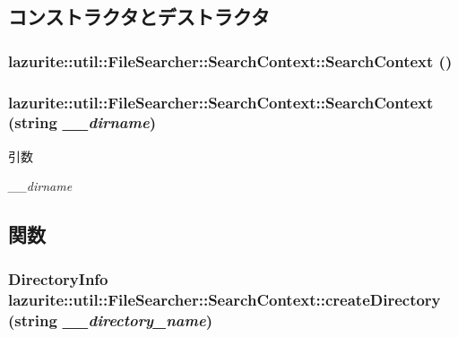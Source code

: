 \subsection{コンストラクタとデストラクタ}
\hypertarget{classlazurite_1_1util_1_1_file_searcher_1_1_search_context_a5a90c80e8b4e542a1ef42f04eb9fcbc2}{
\subsubsection[{SearchContext}]{\setlength{\rightskip}{0pt plus 5cm}lazurite::util::FileSearcher::SearchContext::SearchContext ()}}
\label{classlazurite_1_1util_1_1_file_searcher_1_1_search_context_a5a90c80e8b4e542a1ef42f04eb9fcbc2}
\hypertarget{classlazurite_1_1util_1_1_file_searcher_1_1_search_context_a41285ae06cde6bea5e886ad2a54d4b24}{
\subsubsection[{SearchContext}]{\setlength{\rightskip}{0pt plus 5cm}lazurite::util::FileSearcher::SearchContext::SearchContext (string {\em \_\-\_\-dirname})}}
\label{classlazurite_1_1util_1_1_file_searcher_1_1_search_context_a41285ae06cde6bea5e886ad2a54d4b24}

\begin{DoxyParams}{引数}
\item[{\em \_\-\_\-dirname}]\end{DoxyParams}


\subsection{関数}
\hypertarget{classlazurite_1_1util_1_1_file_searcher_1_1_search_context_afd039a9d56941fe74be508a1b632affb}{
\subsubsection[{createDirectory}]{\setlength{\rightskip}{0pt plus 5cm}DirectoryInfo lazurite::util::FileSearcher::SearchContext::createDirectory (string {\em \_\-\_\-directory\_\-name})}}
\label{classlazurite_1_1util_1_1_file_searcher_1_1_search_context_afd039a9d56941fe74be508a1b632affb}

